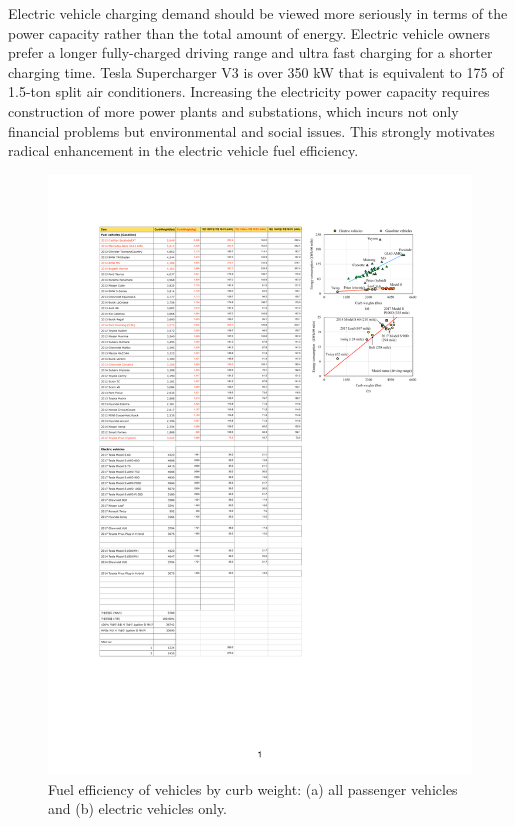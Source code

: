 \documentclass[journal]{IEEEtran}
\begin{document}
Electric vehicle charging demand should be viewed more seriously in terms of the power capacity rather than the total amount of energy. 
Electric vehicle owners prefer a longer fully-charged driving range and ultra fast charging for a shorter charging time. 
Tesla Supercharger V3 is over 350 kW that is equivalent to 175 of 1.5-ton split air conditioners. Increasing the electricity power capacity requires construction of more power plants and substations, which incurs not only financial problems but environmental and social issues. This strongly motivates radical enhancement in the electric vehicle fuel efficiency.

\begin{figure}
\centering
\includegraphics[width=0.9\hsize]{Figures/fuel_efficiency.pdf}
\caption{Fuel efficiency of vehicles by curb weight: (a) all passenger vehicles and (b) electric vehicles only.}
\label{fig:fuel_efficiency}
\end{figure}      
\end{document}
